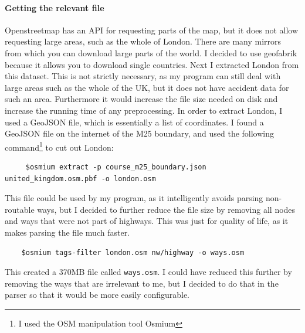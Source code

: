 \documentclass[11pt,twoside,a4paper]{article}
\begin{document}
\paragraph{Getting the relevant file}
Openstreetmap has an API for requesting parts of the map, but it does not allow requesting large areas, such as the whole of London. There are many mirrors from which you can download large parts of the world. I decided to use geofabrik \cite{geofabrik}
 because it allows you to download single countries. Next I extracted London from this dataset. This is not strictly necessary, as my program can still deal with large areas such as the whole of the UK, but it does not have accident data for such an area.
 Furthermore it would increase the file size needed on disk and increase the running time of any preprocessing. In order to extract London, I used a GeoJSON\cite{geojsondefinition} file, which is essentially a list of coordinates. I found a GeoJSON file on the internet \cite{geojsonsource}
 of the M25 boundary, and used the following command\footnote{I used the OSM manipulation tool Osmium} to cut out London: 
 \begin{verbatim}
     $osmium extract -p course_m25_boundary.json united_kingdom.osm.pbf -o london.osm
 \end{verbatim}
 This file could be used by my program, as it intelligently avoids parsing non-routable ways, but I decided to further reduce the file size by removing all nodes and ways that were not part of highways.
 This was just for quality of life, as it makes parsing the file much faster.
 \begin{verbatim}
    $osmium tags-filter london.osm nw/highway -o ways.osm
 \end{verbatim}
 This created a 370MB file called \texttt{ways.osm}. I could have reduced this further by removing the ways that are irrelevant to me, but I decided to do that in the parser so that it would be
 more easily configurable.
\end{document}
